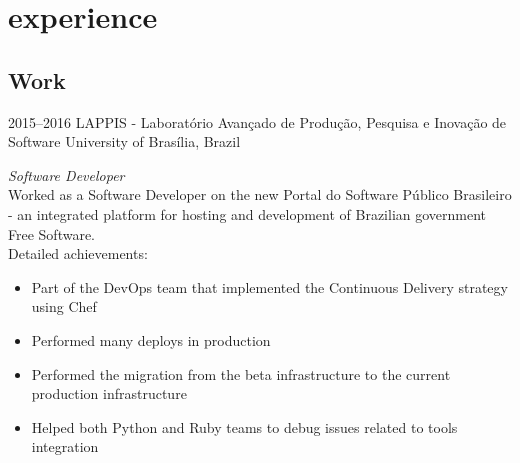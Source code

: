 \documentclass[]{friggeri-cv} %
\begin{document}

\section{experience}

\subsection{Work}

\begin{entrylist}


\entry
{2015--2016}
{LAPPIS - Laboratório Avançado de Produção, Pesquisa e Inovação de Software}
{University of Brasília, Brazil}
{\emph{Software Developer} \\
  Worked as a Software Developer on the new Portal do Software Público Brasileiro - an integrated platform for hosting and development of Brazilian government Free Software. \\
Detailed achievements:
\begin{itemize}
  \item Part of the DevOps team that implemented the Continuous Delivery strategy using Chef
  \item Performed many deploys in production
  \item Performed the migration from the beta infrastructure to the current production infrastructure
  \item Helped both Python and Ruby teams to debug issues related to tools integration
\end{itemize}}


\end{entrylist}
\end{document}
